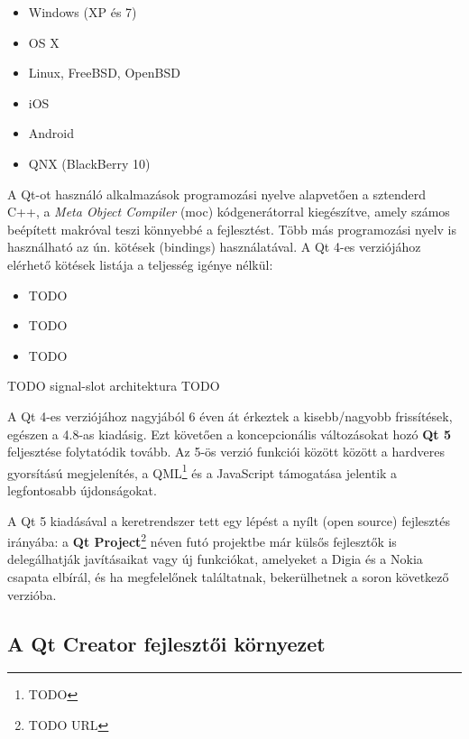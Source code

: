 \begin{itemize}
  \item Windows (XP és 7)
  \item OS X
  \item Linux, FreeBSD, OpenBSD
  \item iOS
  \item Android
  \item QNX (BlackBerry 10)
\end{itemize}

\bigskip

A Qt-ot használó alkalmazások programozási nyelve alapvetően a sztenderd C++, a \emph{Meta Object Compiler} (moc) kódgenerátorral kiegészítve, amely számos beépített makróval teszi könnyebbé a fejlesztést. Több más programozási nyelv is használható az ún. kötések (bindings) használatával. A Qt 4-es verziójához elérhető kötések listája a teljesség igénye nélkül:

\begin{itemize}
  \item TODO
  \item TODO
  \item TODO
\end{itemize}

\bigskip

TODO signal-slot architektura TODO

\bigskip

A Qt 4-es verziójához nagyjából 6 éven át érkeztek a kisebb/nagyobb frissítések, egészen a 4.8-as kiadásig. Ezt követően a koncepcionális változásokat hozó \textbf{Qt 5} feljesztése folytatódik tovább. Az 5-ös verzió funkciói között között a hardveres gyorsítású megjelenítés, a QML\footnote{TODO} és a JavaScript támogatása jelentik a legfontosabb újdonságokat.

A Qt 5 kiadásával a keretrendszer tett egy lépést a nyílt (open source) fejlesztés irányába: a \textbf{Qt Project}\footnote{TODO URL} néven futó projektbe már külsős fejlesztők is delegálhatják javításaikat vagy új funkciókat, amelyeket a Digia és a Nokia csapata elbírál, és ha megfelelőnek találtatnak, bekerülhetnek a soron következő verzióba.

\subsection{A Qt Creator fejlesztői környezet}\label{sect:qt_creator}

